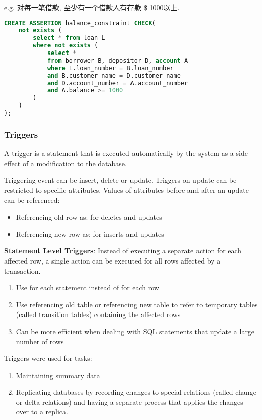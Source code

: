 e.g. 对每一笔借款, 至少有一个借款人有存款 \$ 1000以上. 

\begin{lstlisting}[language=sql, morekeywords={REFERENCES, WITH}]
CREATE ASSERTION balance_constraint CHECK(
    not exists (
        select * from loan L
        where not exists (
            select *
            from borrower B, depositor D, account A
            where L.loan_number = B.loan_number
            and B.customer_name = D.customer_name
            and D.account_number = A.account_number
            and A.balance >= 1000
        )
    )
);
\end{lstlisting}


\subsubsection{Triggers}
A trigger is a statement that is executed automatically by the system as a side-effect of a modification to the database. 

Triggering event can be insert, delete or update. Triggers on update can be restricted to specific attributes.  Values of attributes before and after an update can be referenced:
\begin{itemize}
    \item Referencing old row as: for deletes and updates
    \item Referencing new row as: for inserts and updates
\end{itemize}

\textbf{Statement Level Triggers}: Instead of executing a separate action for each affected row, a single action can be executed for all rows affected by a transaction. 
\begin{enumerate}
    \item Use for each statement instead of for each row
    \item Use referencing old table or referencing new table to refer to temporary tables (called transition tables) containing the affected rows
    \item Can be more efficient when dealing with SQL statements that update a large number of rows    
\end{enumerate}

Triggers were used for tasks: 
\begin{enumerate}
    \item Maintaining summary data
    \item Replicating databases by recording changes to special relations (called change or delta relations) and having a separate process that applies the changes over to a replica.
\end{enumerate}

